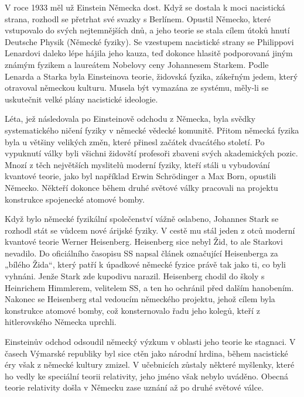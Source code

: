  V roce 1933 měl už Einstein Německa dost. Když se dostala k moci nacistická strana, rozhodl se
  přetrhat své svazky s Berlínem. Opustil Německo, které vstupovalo do svých nejtemnějších dnů, a
  jeho teorie se stala cílem útoků hnutí Deutsche Physik (Německé fyziky). Se vzestupem nacistické
  strany se Philippovi Lenardovi daleko lépe hájila jeho kauza, teď dokonce hlasitě podporovaná
  jiným známým fyzikem a laureátem Nobelovy ceny Johannesem Starkem. Podle Lenarda a Starka byla
  Einsteinova teorie, židovská fyzika, zákeřným jedem, který otravoval německou kulturu. Musela být
  vymazána ze systému, měly-li se uskutečnit velké plány nacistické ideologie. 
  
  Léta, jež následovala po Einsteinově odchodu z Německa, byla svědky systematického ničení fyziky v
  německé vědecké komunitě. Přitom německá fyzika byla u většiny velikých změn, které přinesl
  začátek dvacátého století. Po vypuknutí války byli všichni židovští profesoři zbaveni svých
  akademických pozic. Mnozí z těch největších myslitelů moderní fyziky, kteří stáli u vybudování
  kvantové teorie, jako byl například Erwin Schrödinger a Max Born, opustili Německo. Někteří
  dokonce během druhé světové války pracovali na projektu konstrukce spojenecké atomové bomby. 
  
  Když bylo německé fyzikální společenství vážně oslabeno, Johannes Stark se rozhodl stát se vůdcem
  nové árijské fyziky. V cestě mu stál jeden z otců moderní kvantové teorie Werner Heisenberg.
  Heisenberg sice nebyl Žid, to ale Starkovi nevadilo. Do oficiálního časopisu SS napsal článek
  označující Heisenberga za „bílého Žida“, který patří k úpadkové německé fyzice právě tak jako ti,
  co byli vyhnáni. Jenže Stark zde kupodivu narazil. Heisenberg chodil do školy s Heinrichem
  Himmlerem, velitelem SS, a ten ho ochránil před dalším hanobením. Nakonec se Heisenberg stal
  vedoucím německého projektu, jehož cílem byla konstrukce atomové bomby, což konsternovalo řadu
  jeho kolegů, kteří z hitlerovského Německa uprchli. 
  
  Einsteinův odchod odsoudil německý výzkum v oblasti jeho teorie ke stagnaci. V časech Výmarské
  republiky byl sice ctěn jako národní hrdina, během nacistické éry však z německé kultury zmizel. V
  učebnicích zůstaly některé myšlenky, které ho vedly ke speciální teorii relativity, jeho jméno
  však nebylo uváděno. Obecná teorie relativity došla v Německu zase uznání až po druhé světové
  válce. 
  
